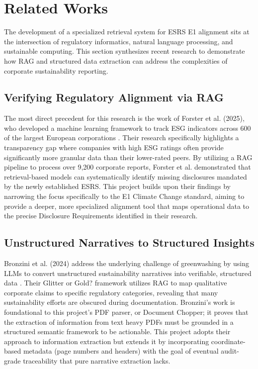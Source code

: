 \documentclass[12pt]{article}
\begin{document}
\section{Related Works}
The development of a specialized retrieval system for ESRS E1 alignment sits at the intersection of regulatory informatics, natural language processing, and sustainable computing. This section synthesizes recent research to demonstrate how RAG and structured data extraction can address the complexities of corporate sustainability reporting.

\subsection{Verifying Regulatory Alignment via RAG}
The most direct precedent for this research is the work of Forster et al. (2025), who developed a machine learning framework to track ESG indicators across 600 of the largest European corporations \cite{articleICLR}. Their research specifically highlights a transparency gap where companies with high ESG ratings often provide significantly more granular data than their lower-rated peers. By utilizing a RAG pipeline to process over 9,200 corporate reports, Forster et al. demonstrated that retrieval-based models can systematically identify missing disclosures mandated by the newly established ESRS. This project builds upon their findings by narrowing the focus specifically to the E1 Climate Change standard, aiming to provide a deeper, more specialized alignment tool that maps operational data to the precise Disclosure Requirements identified in their research.

\subsection{Unstructured Narratives to Structured Insights}
Bronzini et al. (2024) address the underlying challenge of greenwashing by using LLMs to convert unstructured sustainability narratives into verifiable, structured data \cite{articleEPJ}. Their Glitter or Gold? framework utilizes RAG to map qualitative corporate claims to specific regulatory categories, revealing that many sustainability efforts are obscured during documentation. Bronzini’s work is foundational to this project’s PDF parser, or Document Chopper; it proves that the extraction of information from text heavy PDFs must be grounded in a structured semantic framework to be actionable. This project adopts their approach to information extraction but extends it by incorporating coordinate-based metadata (page numbers and headers) with the goal of eventual audit-grade traceability that pure narrative extraction lacks.
\end{document}
